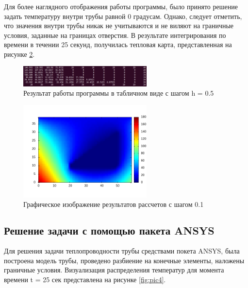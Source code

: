 \documentclass[12pt, a4paper]{article}
\begin{document}
	Для более наглядного отображения работы программы, было принято решение задать температуру внутри трубы равной 0 градусам. Однако, следует отметить, что значения внутри трубы никак не учитываются и не виляют на граничные условия, заданные на границах отверстия. В результате интегрирования по времени в течении 25 секунд, получилась тепловая карта, представленная на рисунке \ref{fig:pic2}. 
	
	\begin{figure}[h]
		\centering    %
		\includegraphics[width=0.6\textwidth]{static/TableResult.png}
		\caption{Результат работы программы в табличном виде с шагом h = 0.5} %
		\label{fig:pic3} %
	\end{figure}
	
	\begin{figure}[h]
		\centering    %
		\includegraphics[width=0.6\textwidth]{static/heatmap.png}
		\caption{Графическое изображение результатов рассчетов с шагом 0.1} %
		\label{fig:pic2} %
	\end{figure}

    \subsection{Решение задачи с помощью пакета ANSYS}
    Для решения задачи теплопроводности трубы средствами покета ANSYS, была построена модель трубы, проведено разбиение на конечные элементы, наложены граничные условия. Визуализация распределения температур для момента времени t = 25 сек представлена на рисунке \ref{fig:pic4}.
    
\end{document}
